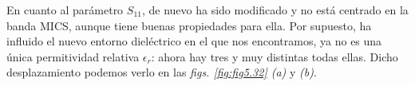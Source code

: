 \begin{table}[h]
    \centering{}
    \caption{Propiedades del bloque de tres capas (piel, grasa y músculo) diseñado para la simulación.}
    \label{tab:tabla5.5}
\end{table}

En cuanto al parámetro $S_{11}$, de nuevo ha sido modificado y no está centrado en la banda MICS, aunque tiene buenas propiedades para ella. Por supuesto, ha influido el nuevo entorno dieléctrico en el que nos encontramos, ya no es una única permitividad relativa $\epsilon_{r}$: ahora hay tres y muy distintas todas ellas. Dicho desplazamiento podemos verlo en las \textit{figs. \ref{fig:fig5.32} (a)} y \textit{(b)}.

